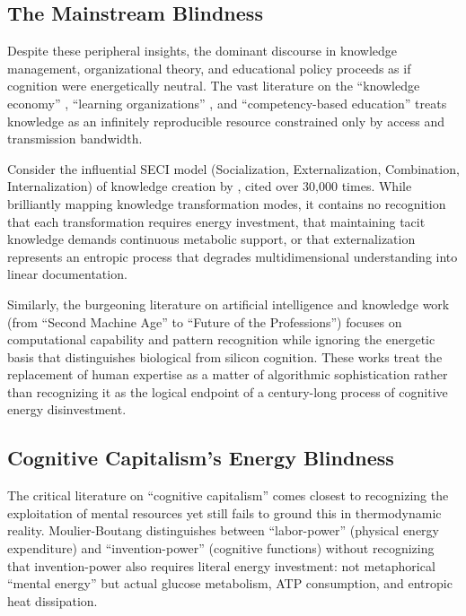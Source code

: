 \subsection{The Mainstream Blindness}

Despite these peripheral insights, the dominant discourse in knowledge management, organizational theory, and educational policy proceeds as if cognition were energetically neutral. The vast literature on the ``knowledge economy'' \citep{powell2004}, ``learning organizations'' \citep{senge1990}, and ``competency-based education'' \citep{mulder2007} treats knowledge as an infinitely reproducible resource constrained only by access and transmission bandwidth.

Consider the influential SECI model (Socialization, Externalization, Combination, Internalization) of knowledge creation by \citet{nonaka1995}, cited over 30,000 times. While brilliantly mapping knowledge transformation modes, it contains no recognition that each transformation requires energy investment, that maintaining tacit knowledge demands continuous metabolic support, or that externalization represents an entropic process that degrades multidimensional understanding into linear documentation.

Similarly, the burgeoning literature on artificial intelligence and knowledge work (from \citet{brynjolfsson2014} ``Second Machine Age'' to \citet{susskind2020} ``Future of the Professions'') focuses on computational capability and pattern recognition while ignoring the energetic basis that distinguishes biological from silicon cognition. These works treat the replacement of human expertise as a matter of algorithmic sophistication rather than recognizing it as the logical endpoint of a century-long process of cognitive energy disinvestment.

\subsection{Cognitive Capitalism's Energy Blindness}

The critical literature on ``cognitive capitalism'' \citep{moulierboutang2007, vercellone2007} comes closest to recognizing the exploitation of mental resources yet still fails to ground this in thermodynamic reality. Moulier-Boutang distinguishes between ``labor-power'' (physical energy expenditure) and ``invention-power'' (cognitive functions) without recognizing that invention-power also requires literal energy investment: not metaphorical ``mental energy'' but actual glucose metabolism, ATP consumption, and entropic heat dissipation.

